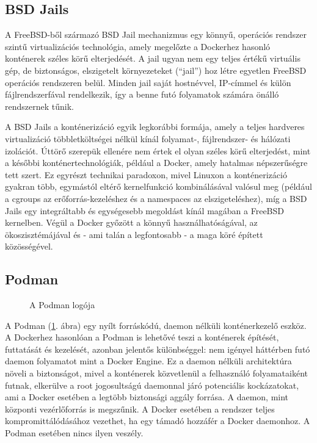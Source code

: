 \subsection{BSD Jails}

A FreeBSD-ből származó BSD Jail mechanizmus egy könnyű, operációs rendszer
szintű virtualizációs technológia, amely megelőzte a Dockerhez hasonló
konténerek széles körű elterjedését. A jail ugyan nem egy teljes értékű
virtuális gép, de biztonságos, elszigetelt környezeteket (``jail'') hoz létre
egyetlen FreeBSD operációs rendszeren belül. Minden jail saját hostnévvel,
IP-címmel és külön fájlrendszerfával rendelkezik, így a benne futó folyamatok
számára önálló rendszernek tűnik.

A BSD Jails a konténerizáció egyik legkorábbi formája, amely a teljes hardveres
virtualizáció többletköltségei nélkül kínál folyamat-, fájlrendszer- és
hálózati izolációt. Úttörő szerepük ellenére nem értek el olyan széles körű
elterjedést, mint a későbbi konténertechnológiák, például a Docker, amely
hatalmas népszerűségre tett szert. Ez egyrészt technikai paradoxon, mivel
Linuxon a konténerizáció gyakran több, egymástól eltérő kernelfunkció
kombinálásával valósul meg (például a cgroups az erőforrás-kezeléshez és a
namespaces az elszigeteléshez), míg a BSD Jails egy integráltabb és egységesebb
megoldást kínál magában a FreeBSD kernelben. Végül a Docker győzött a könnyű
használhatóságával, az ökoszisztémájával és - ami talán a legfontosabb - a maga
köré épített közösségével.

\subsection{Podman}

\begin{figure}[!h]
        \centering
        
        \caption{A Podman logója}
        \label{podman}
\end{figure}

A Podman (\ref{podman}. ábra) egy nyílt forráskódú, daemon nélküli
konténerkezelő eszköz. A Dockerhez hasonlóan a Podman is lehetővé teszi a
konténerek építését, futtatását és kezelését, azonban jelentős különbséggel:
nem igényel háttérben futó daemon folyamatot mint a Docker Engine. Ez a daemon
nélküli architektúra növeli a biztonságot, mivel a konténerek közvetlenül a
felhasználó folyamataiként futnak, elkerülve a root jogosultságú daemonnal járó
potenciális kockázatokat, ami a Docker esetében a legtöbb biztonsági aggály
forrása. A daemon, mint központi vezérlőforrás is megszűnik. A Docker esetében
a rendszer teljes kompromittálódásához vezethet, ha egy támadó hozzáfér a
Docker daemonhoz. A Podman esetében nincs ilyen veszély.

